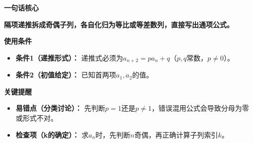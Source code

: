 \begin{summarybox}
	\textbf{\textcolor{CSummary}{一句话核心}}

	\textbf{隔项递推拆成奇偶子列，各自化归为等比或等差数列，直接写出通项公式。}

	\medskip
	\textbf{\textcolor{CSummary}{使用条件}}
	\begin{itemize}[leftmargin=*, itemsep=0.5em, topsep=0.4em]
		\item \textbf{条件1（递推形式）：} 递推式必须为$a_{n+2}=p a_n+q$（$p,q$常数，$p\neq0$）。
		\item \textbf{条件2（初值给定）：} 已知首两项$a_1,a_2$的值。
	\end{itemize}

	\medskip
	\textbf{\textcolor{CSummary}{关键提醒}}
	\begin{itemize}[leftmargin=*, itemsep=0.5em, topsep=0.4em]
		\item \textbf{易错点（分类讨论）：} 先判断$p=1$还是$p\neq1$，错误混用公式会导致分母为零或形式不对。
		\item \textbf{检查项（k的确定）：} 求$a_n$时，先判断$n$奇偶，再正确计算子列索引$k$。
	\end{itemize}
\end{summarybox}
